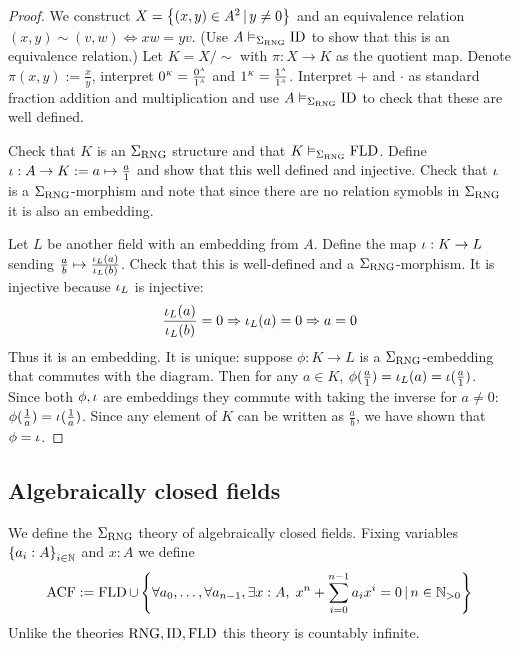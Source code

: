 \begin{proof}
    We construct $X = \left\{(x,y) \in A^2 \,|\, y \ne 0\right\}$ and
    an equivalence relation $(x,y) \sim (v, w) \iff xw = yv$. 
    (Use $A \vDash_{\Sigma_{\mathrm{RNG}}} \operatorname{ID}$ 
    to show that this is an equivalence relation.)
    Let ${K} = X / \sim$ with $\pi : X \to K$ as the quotient map. 
    Denote $\pi(x,y) := \frac{x}{y}$, 
    interpret $\modintp{K}{0} = \frac{\modintp{A}{0}}{\modintp{A}{1}}$ 
    and $\modintp{K}{1} = \frac{\modintp{A}{1}}{\modintp{A}{1}}$.
    Interpret $+$ and $\cdot$ as standard fraction addition and multiplication
    and use $A \vDash_{\Sigma_{\mathrm{RNG}}} \operatorname{ID}$ to check that these are well defined.

    Check that $K$ is an $\Sigma_{\mathrm{RNG}}$ structure and that 
    $K \vDash_{\Sigma_{\mathrm{RNG}}} \operatorname{FLD}$.
    Define $\iota : {A} \to {K} := a \mapsto \frac{a}{1}$
    and show that this well defined and injective.
    Check that $\iota$ is a $\Sigma_{\mathrm{RNG}}$-morphism
    and note that since there are no relation symobls in $\Sigma_{\mathrm{RNG}}$
    it is also an embedding.

    Let $L$ be another field with an embedding from $A$.
    Define the map $\iota : K \to L$ sending 
    $\frac{a}{b} \mapsto \frac{\iota_L (a)}{\iota_L(b)}$.
    Check that this is well-defined and a $\Sigma_{\mathrm{RNG}}$-morphism.
    It is injective because $\iota_L$ is injective:
    \[\frac{\iota_L(a)}{\iota_L(b)} = 0 \Rightarrow \iota_L(a) = 0
    \Rightarrow a = 0\]
    Thus it is an embedding.
    It is unique: suppose $\phi : K \to L$ is a $\Sigma_{\mathrm{RNG}}$-embedding
    that commutes with the diagram.
    Then for any $a \in K$, 
    $\phi(\frac{a}{1}) = \iota_L(a) = \iota (\frac{a}{1})$.
    Since both $\phi, \iota$ are embeddings
    they commute with taking the inverse for $a \ne 0$:
    $\phi(\frac{1}{a}) = \iota (\frac{1}{a})$.
    Since any element of $K$ can be written as $\frac{a}{b}$,
    we have shown that $\phi = \iota$.
\end{proof}

\subsection{Algebraically closed fields}
\begin{dfn}
  We define the $\Sigma_{\mathrm{RNG}}$ theory of algebraically closed fields.
  Fixing variables $\left\{a_i : A\right\}_{i \in \mathbb{N}}$ and $x : A$ we define
    \[
        \operatorname{ACF} := 
        \operatorname{FLD} \cup \left\{\forall a_0, \dots, \forall a_{n-1}, \exists x : A, \;
        x^n + \sum_{i = 0}^{n-1} a_i x^i = 0
        \,|\, n \in \mathbb{N}_{>0}\right\}
        \]
    Unlike the theories $\mathrm{RNG},\operatorname{ID},\operatorname{FLD}$ 
    this theory is countably infinite.
\end{dfn}


